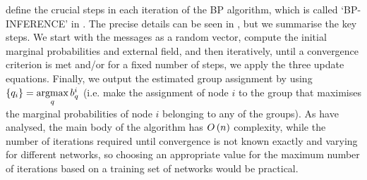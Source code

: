  define the crucial steps in each iteration of the BP algorithm, which is called `\textsc{BP-INFERENCE}' in \cite{DKM+13}.
The precise details can be seen in \cite{DKM+13}, but we summarise the key steps.
We start with the messages as a random vector, compute the initial marginal probabilities and external field, and then iteratively, until a convergence criterion is met and/or for a fixed number of steps, we apply the three update equations.
Finally, we output the estimated group assignment by using $\{ q_{i} \} = \argmax_{q} b_{q}^{i}$ (i.e. make the assignment of node $i$ to the group that maximises the marginal probabilities of node $i$ belonging to any of the groups).
As \cite{DKM+13} have analysed, the main body of the algorithm has $O\left(n\right)$ complexity, while the number of iterations required until convergence is not known exactly and varying for different networks, so choosing an appropriate value for the maximum number of iterations based on a training set of networks would be practical.

